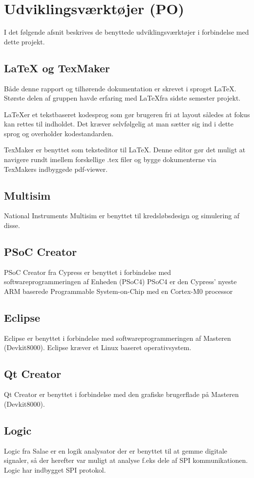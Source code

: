 
\chapter{Udviklingsværktøjer (PO)}
I det følgende afsnit beskrives de benyttede udviklingsværktøjer i forbindelse med dette projekt. 

\section{LaTeX og TexMaker}
Både denne rapport og tilhørende dokumentation er skrevet i sproget \LaTeX. Største delen af gruppen havde erfaring med \LaTeX fra sidste semester projekt. 

\LaTeX er et tekstbaseret kodesprog som gør brugeren fri at layout således at fokus kan rettes til indholdet. Det kræver selvfølgelig at man sætter sig ind i dette sprog og overholder kodestandarden. 

TexMaker er benyttet som teksteditor til \LaTeX. Denne editor gør det muligt at navigere rundt imellem forskellige .tex filer og bygge dokumenterne via TexMakers indbyggede pdf-viewer.

\section{Multisim}
National Instruments Multisim er benyttet til kredsløbsdesign og simulering af disse. 

\section{PSoC Creator}
PSoC Creator fra Cypress er benyttet i forbindelse med softwareprogrammeringen af Enheden (PSoC4)
PSoC4 er den Cypress' nyeste ARM baserede Programmable System-on-Chip med en Cortex-M0 processor 

\section{Eclipse}
Eclipse er benyttet i forbindelse med softwareprogrammeringen af Masteren (Devkit8000). Eclipse kræver et Linux baseret operativsystem.

\section{Qt Creator}
Qt Creator er benyttet i forbindelse med den grafiske brugerflade på Masteren (Devkit8000).

\section{Logic}
Logic fra Salae er en logik analysator der er benyttet til at gemme digitale signaler, så der herefter var muligt at analyse f.eks dele af SPI kommunikationen. Logic har indbygget SPI protokol.

